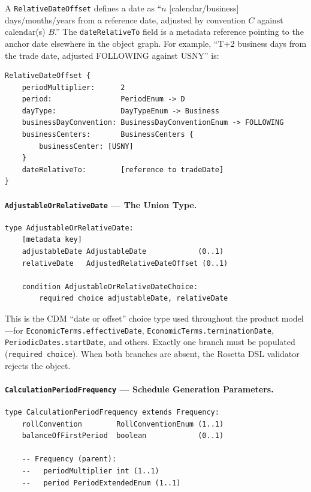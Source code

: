 \documentclass[11pt,a4paper]{article}
\begin{document}
\noindent A \texttt{RelativeDateOffset} defines a date as ``$n$ [calendar/business] days/months/years from a reference date, adjusted by convention $C$ against calendar(s) $B$.'' The \texttt{dateRelativeTo} field is a metadata reference pointing to the anchor date elsewhere in the object graph. For example, ``T+2 business days from the trade date, adjusted FOLLOWING against USNY'' is:

\begin{lstlisting}
RelativeDateOffset {
    periodMultiplier:      2
    period:                PeriodEnum -> D
    dayType:               DayTypeEnum -> Business
    businessDayConvention: BusinessDayConventionEnum -> FOLLOWING
    businessCenters:       BusinessCenters {
        businessCenter: [USNY]
    }
    dateRelativeTo:        [reference to tradeDate]
}
\end{lstlisting}

\paragraph{\texttt{AdjustableOrRelativeDate} --- The Union Type.}

\begin{lstlisting}
type AdjustableOrRelativeDate:
    [metadata key]
    adjustableDate AdjustableDate            (0..1)
    relativeDate   AdjustedRelativeDateOffset (0..1)

    condition AdjustableOrRelativeDateChoice:
        required choice adjustableDate, relativeDate
\end{lstlisting}

\noindent This is the CDM ``date or offset'' choice type used throughout the product model---for \texttt{EconomicTerms.effectiveDate}, \texttt{EconomicTerms.terminationDate}, \texttt{PeriodicDates.startDate}, and others. Exactly one branch must be populated (\texttt{required choice}). When both branches are absent, the Rosetta DSL validator rejects the object.

\paragraph{\texttt{CalculationPeriodFrequency} --- Schedule Generation Parameters.}

\begin{lstlisting}
type CalculationPeriodFrequency extends Frequency:
    rollConvention        RollConventionEnum (1..1)
    balanceOfFirstPeriod  boolean            (0..1)

    -- Frequency (parent):
    --   periodMultiplier int (1..1)
    --   period PeriodExtendedEnum (1..1)
\end{lstlisting}
\end{document}
